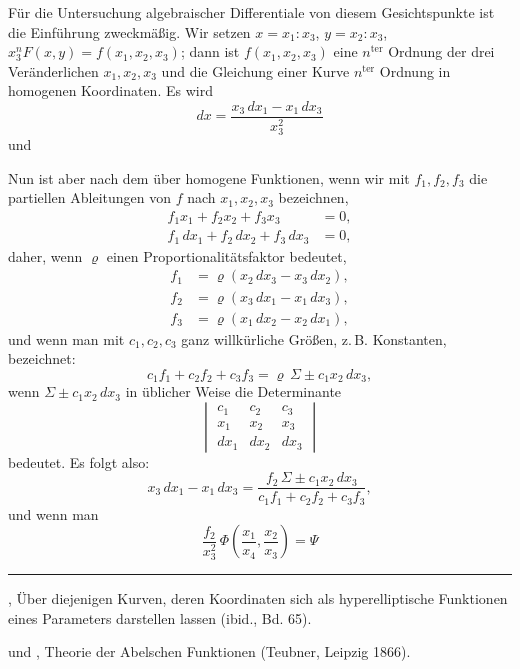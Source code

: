 
Für die Untersuchung algebraischer Differentiale von diesem
Gesichtspunkte ist die Einführung  zweckmäßig.
Wir setzen $x = x_1{:}x_3$, $y = x_2{:}x_3$, $x_3^n F(x,y) = f(x_1,x_2,x_3)$;
dann ist $f(x_1,x_2,x_3)$ eine  $n^{\mathrm{ter}}$ Ordnung
der drei Veränderlichen $x_1, x_2, x_3$ und
die Gleichung einer Kurve $n^{\mathrm{ter}}$ Ordnung in homogenen Koordinaten.
Es wird
\[
dx = \frac{x_3\,dx_1 - x_1\,dx_3}{x_3^2}
\]
und

Nun ist aber nach dem  über homogene
Funktionen, wenn wir mit $f_1, f_2, f_3$ die partiellen Ableitungen
von $f$ nach $x_1, x_2, x_3$ bezeichnen,
\[
\begin{aligned}
f_1x_1 + f_2x_2 + f_3x_3 &= 0,\\
f_1\,dx_1 + f_2\,dx_2 + f_3\,dx_3 &= 0,
\end{aligned}
\]
daher, wenn $\varrho$ einen Proportionalitätsfaktor bedeutet,
\[
\begin{aligned}
f_1 &= \varrho(x_2\,dx_3 - x_3\,dx_2),\\
f_2 &= \varrho(x_3\,dx_1 - x_1\,dx_3),\\
f_3 &= \varrho(x_1\,dx_2 - x_2\,dx_1),
\end{aligned}
\]
und wenn man mit $c_1, c_2, c_3$ ganz willkürliche Größen, z.\,B. Konstanten,
bezeichnet:
\[
c_1f_1 + c_2f_2 + c_3f_3 = \varrho\,\Sigma \pm c_1x_2\,dx_3,
\]
wenn $\Sigma \pm c_1x_2\,dx_3$ in üblicher Weise die Determinante
\[
\begin{vmatrix} c_1 & c_2 & c_3 \\ x_1 & x_2 & x_3 \\ dx_1 & dx_2 & dx_3 \end{vmatrix}
\]
bedeutet. Es folgt also:
\[
x_3\,dx_1 - x_1\,dx_3 = \frac{f_2\,\Sigma \pm c_1x_2\,dx_3}{c_1f_1 + c_2f_2 + c_3f_3},
\]
und wenn man
\[
\frac{f_2}{x_3^2}\,\Phi\!\left(\frac{x_1}{x_4}, \frac{x_2}{x_3}\right) = \Psi
\]


\begin{center}\rule{2cm}{0.4pt}\end{center}
, Über diejenigen Kurven, deren Koordinaten sich als hyperelliptische Funktionen eines Parameters darstellen lassen (ibid., Bd. 65).

 und , Theorie der Abelschen Funktionen (Teubner, Leipzig 1866).
